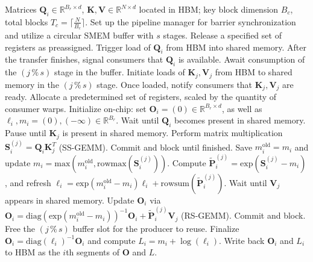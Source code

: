 \begin{algorithm}[H]
    \caption{\small\label{alg:flash3_wgmma_ws_only}\textsc{FlashAttention-3} forward pass \textbf{excluding} intra-consumer overlap -- CTA perspective}
    \begin{algorithmic}[1]
\REQUIRE Matrices $\mathbf{Q}_i \in \mathbb{R}^{B_r \times d}$, $\mathbf{K}, \mathbf{V} \in \mathbb{R}^{N \times d}$ located in HBM; key block dimension $B_c$, total blocks $T_c = \lceil \frac{N}{B_c} \rceil$.
\STATE Set up the pipeline manager for barrier synchronization and utilize a circular SMEM buffer with $s$ stages.
\STATE Release a specified set of registers as preassigned.
\STATE Trigger load of $\mathbf{Q}_i$ from HBM into shared memory.
\STATE After the transfer finishes, signal consumers that $\mathbf{Q}_i$ is available.
    \STATE Await consumption of the $(j\,\%\,s)$ stage in the buffer.
    \STATE Initiate loads of $\mathbf{K}_j, \mathbf{V}_j$ from HBM to shared memory in the $(j\,\%\,s)$ stage.
    \STATE Once loaded, notify consumers that $\mathbf{K}_j, \mathbf{V}_j$ are ready.
\ENDFOR
\ELSE \STATE Allocate a predetermined set of registers, scaled by the quantity of consumer warps.
\STATE Initialize on-chip: set $\mathbf{O}_i = (0) \in \mathbb{R}^{B_r \times d}$, as well as $\ell_i, m_i = (0), (-\infty) \in \mathbb{R}^{B_r}$.
\STATE Wait until $\mathbf{Q}_i$ becomes present in shared memory.
\STATE Pause until $\mathbf{K}_j$ is present in shared memory.
\STATE Perform matrix multiplication $\mathbf{S}_i^{(j)} = \mathbf{Q}_i \mathbf{K}_j^T$ (SS-GEMM). Commit and block until finished. \label{alg:ws_only_gemm1}
\STATE Save $m_i^{\mathrm{old}} = m_i$ and update $m_i = \mathrm{max}(m_i^{\mathrm{old}}, \mathrm{rowmax}(\mathbf{S}_i^{(j)}))$. \label{code-ws:softmax_start}
\STATE Compute $\widetilde{\mathbf{P}}_i^{(j)} = \mathrm{exp}(\mathbf{S}_i^{(j)} - m_i)$, and refresh $\ell_i = \mathrm{exp}(m_i^{\mathrm{old}} - m_i) \ell_i + \mathrm{rowsum}(\widetilde{\mathbf{P}}_i^{(j)})$. \label{code-ws:softmax_end}
\STATE Wait until $\mathbf{V}_j$ appears in shared memory.
\STATE Update $\mathbf{O}_i$ via $\mathbf{O}_i = \mathrm{diag}(\mathrm{exp}(m_i^{\mathrm{old}} - m_i))^{-1} \mathbf{O}_i + \widetilde{\mathbf{P}}_i^{(j)} \mathbf{V}_j$ (RS-GEMM). Commit and block. \label{alg:ws_only_gemm2}
\STATE Free the $(j\,\%\,s)$ buffer slot for the producer to reuse.
\ENDFOR
\STATE Finalize $\mathbf{O}_i = \mathrm{diag}(\ell_i)^{-1} \mathbf{O}_i$ and compute $L_i = m_i + \log(\ell_i)$.
\STATE Write back $\mathbf{O}_i$ and $L_i$ to HBM as the $i$th segments of $\mathbf{O}$ and $L$.
\ENDIF
\end{algorithmic}
\end{algorithm}

